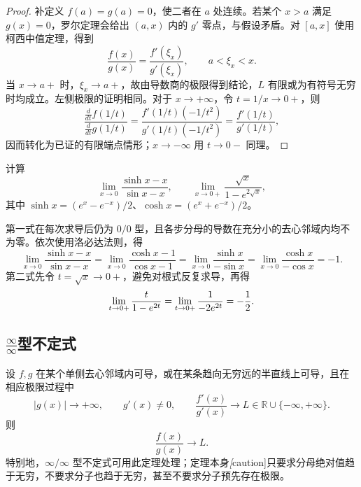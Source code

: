\begin{proof}
补定义 $f(a)=g(a)=0$，使二者在 $a$ 处连续。若某个 $x>a$ 满足 $g(x)=0$，罗尔定理会给出 $(a,x)$ 内的 $g'$ 零点，与假设矛盾。对 $[a,x]$ 使用柯西中值定理，得到
\[
    \frac{f(x)}{g(x)}=\frac{f'(\xi_x)}{g'(\xi_x)},
    \qquad a<\xi_x<x.
\]
当 $x\to a+$ 时，$\xi_x\to a+$，故由导数商的极限得到结论，$L$ 有限或为有符号无穷时均成立。左侧极限的证明相同。对于 $x\to+\infty$，令 $t=1/x\to0+$，则
\[
    \frac{\frac{d}{dt}f(1/t)}{\frac{d}{dt}g(1/t)}
    =\frac{f'(1/t)(-1/t^2)}{g'(1/t)(-1/t^2)}
    =\frac{f'(1/t)}{g'(1/t)},
\]
因而转化为已证的有限端点情形；$x\to-\infty$ 用 $t\to0-$ 同理。
\end{proof}

\begin{example}
\label{ex:lhopital-zero-over-zero-calculations}
计算
\[
    \lim_{x\to0}\frac{\sinh x-x}{\sin x-x},
    \qquad
    \lim_{x\to0+}\frac{\sqrt{x}}{1-e^{2\sqrt{x}}},
\]
其中 $\sinh x=(e^x-e^{-x})/2$、$\cosh x=(e^x+e^{-x})/2$。
\end{example}

\begin{solve}
第一式在每次求导后仍为 $0/0$ 型，且各步分母的导数在充分小的去心邻域内均不为零。依次使用洛必达法则，得
\[
    \lim_{x\to0}\frac{\sinh x-x}{\sin x-x}
    =\lim_{x\to0}\frac{\cosh x-1}{\cos x-1}
    =\lim_{x\to0}\frac{\sinh x}{-\sin x}
    =\lim_{x\to0}\frac{\cosh x}{-\cos x}=-1.
\]
第二式先令 $t=\sqrt{x}\to0+$，避免对根式反复求导，再得
\[
    \lim_{t\to0+}\frac{t}{1-e^{2t}}
    =\lim_{t\to0+}\frac1{-2e^{2t}}=-\frac12.
    \qedhere
\]
\end{solve}

\subsection{\texorpdfstring{$\frac{\infty}{\infty}$}{infinity/infinity}型不定式}
\label{subsec:infinity-over-infinity-indeterminate-form}

\begin{theorem}[分母无界时的洛必达法则]
\label{thm:lhopital-infinite-denominator}
设 $f,g$ 在某个单侧去心邻域内可导，或在某条趋向无穷远的半直线上可导，且在相应极限过程中
\[
    |g(x)|\to+\infty,\qquad g'(x)\neq0,
    \qquad \frac{f'(x)}{g'(x)}\to L
    \in\mathbb{R}\cup\{-\infty,+\infty\}.
\]
则
\begin{equation}
    \frac{f(x)}{g(x)}\to L.
    \label{eq:lhopital-infinite-denominator}
\end{equation}
特别地，$\infty/\infty$ 型不定式可用此定理处理；定理本身\emph[caution]{只要求分母绝对值趋于无穷，不要求分子也趋于无穷，甚至不要求分子预先存在极限}。
\end{theorem}

